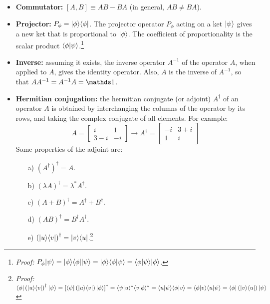 \begin{itemize}
    \item \textbf{Commutator:} $[A, B] \equiv AB - BA$ (in general, $AB \neq BA$).
    \item \textbf{Projector:} $P_\phi = |\phi\rangle\langle\phi|$. The projector operator $P_\phi$ acting on a ket $|\psi\rangle$ gives a new ket that is proportional to $|\phi\rangle$. The coefficient of proportionality is the scalar product $\langle\phi|\psi\rangle$.\footnote{\textit{Proof:} $P_\phi|\psi\rangle = |\phi\rangle\langle\phi||\psi\rangle = |\phi\rangle\langle\phi|\psi\rangle = \langle\phi|\psi\rangle|\phi\rangle$.}
    \item \textbf{Inverse:} assuming it exists, the inverse operator $A^{-1}$ of the operator $A$, when applied to $A$, gives the identity operator. Also, $A$ is the inverse of $A^{-1}$, so that $AA^{-1} = A^{-1}A = \Imat$.
    \item \textbf{Hermitian conjugation:} the hermitian conjugate (or adjoint) $A^\dagger$ of an operator $A$ is obtained by interchanging the columns of the operator by its rows, and taking the complex conjugate of all elements. For example:
    \begin{equation}
        A = \begin{bmatrix}
            i & 1 \\
            3-i & -i
        \end{bmatrix}\rightarrow
        A^\dagger = \begin{bmatrix}
            -i & 3 + i \\
            1 & i
        \end{bmatrix}
    \end{equation}
    Some properties of the adjoint are:
    \begin{enumerate}
        \item[a)] $\left(A^\dagger\right)^\dagger = A$.
        \item[b)] $\left(\lambda A\right)^\dagger = \lambda^*A^\dagger$.
        \item[c)] $\left(A + B\right)^\dagger = A^\dagger + B^\dagger$.
        \item[d)] $\left(A B\right)^\dagger = B^\dagger A^\dagger$.
        \item [e)] $\left(|u\rangle\langle v|\right)^\dagger = |v\rangle\langle u|$.\footnote{\textit{Proof:} $\langle\phi|\left(|u\rangle\langle v|\right)^\dagger|\psi\rangle = \left[\langle\psi|\left(|u\rangle\langle v|\right)|\phi\rangle\right]^* = \langle\psi|u\rangle^*\langle v|\phi\rangle^* = \langle u|\psi\rangle\langle\phi|v\rangle = \langle\phi|v\rangle\langle u|\psi\rangle = \langle\phi|\left(|v\rangle\langle u|\right)|\psi\rangle$}

\end{enumerate}
\end{itemize}
